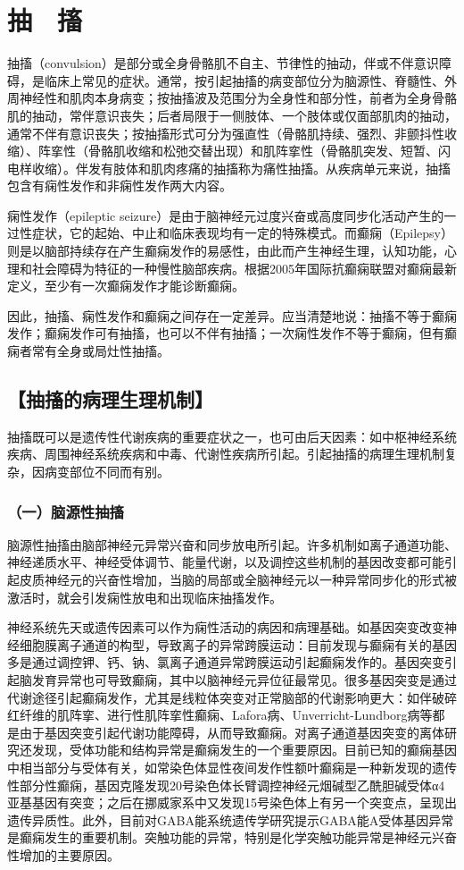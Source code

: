 \chapter{抽　搐}

抽搐（convulsion）是部分或全身骨骼肌不自主、节律性的抽动，伴或不伴意识障碍，是临床上常见的症状。通常，按引起抽搐的病变部位分为脑源性、脊髓性、外周神经性和肌肉本身病变；按抽搐波及范围分为全身性和部分性，前者为全身骨骼肌的抽动，常伴意识丧失；后者局限于一侧肢体、一个肢体或仅面部肌肉的抽动，通常不伴有意识丧失；按抽搐形式可分为强直性（骨骼肌持续、强烈、非颤抖性收缩）、阵挛性（骨骼肌收缩和松弛交替出现）和肌阵挛性（骨骼肌突发、短暂、闪电样收缩）。伴发有肢体和肌肉疼痛的抽搐称为痛性抽搐。从疾病单元来说，抽搐包含有痫性发作和非痫性发作两大内容。

痫性发作（epileptic
seizure）是由于脑神经元过度兴奋或高度同步化活动产生的一过性症状，它的起始、中止和临床表现均有一定的特殊模式。而癫痫（Epilepsy）则是以脑部持续存在产生癫痫发作的易感性，由此而产生神经生理，认知功能，心理和社会障碍为特征的一种慢性脑部疾病。根据2005年国际抗癫痫联盟对癫痫最新定义，至少有一次癫痫发作才能诊断癫痫。

因此，抽搐、痫性发作和癫痫之间存在一定差异。应当清楚地说：抽搐不等于癫痫发作；癫痫发作可有抽搐，也可以不伴有抽搐；一次痫性发作不等于癫痫，但有癫痫者常有全身或局灶性抽搐。

\section{【抽搐的病理生理机制】}

抽搐既可以是遗传性代谢疾病的重要症状之一，也可由后天因素：如中枢神经系统疾病、周围神经系统疾病和中毒、代谢性疾病所引起。引起抽搐的病理生理机制复杂，因病变部位不同而有别。

\subsection{（一）脑源性抽搐}

脑源性抽搐由脑部神经元异常兴奋和同步放电所引起。许多机制如离子通道功能、神经递质水平、神经受体调节、能量代谢，以及调控这些机制的基因改变都可能引起皮质神经元的兴奋性增加，当脑的局部或全脑神经元以一种异常同步化的形式被激活时，就会引发痫性放电和出现临床抽搐发作。

神经系统先天或遗传因素可以作为痫性活动的病因和病理基础。如基因突变改变神经细胞膜离子通道的构型，导致离子的异常跨膜运动：目前发现与癫痫有关的基因多是通过调控钾、钙、钠、氯离子通道异常跨膜运动引起癫痫发作的。基因突变引起脑发育异常也可导致癫痫，其中以脑神经元异位征最常见。很多基因突变是通过代谢途径引起癫痫发作，尤其是线粒体突变对正常脑部的代谢影响更大：如伴破碎红纤维的肌阵挛、进行性肌阵挛性癫痫、Lafora病、Unverricht-Lundborg病等都是由于基因突变引起代谢功能障碍，从而导致癫痫。对离子通道基因突变的离体研究还发现，受体功能和结构异常是癫痫发生的一个重要原因。目前已知的癫痫基因中相当部分与受体有关，如常染色体显性夜间发作性额叶癫痫是一种新发现的遗传性部分性癫痫，基因克隆发现20号染色体长臂调控神经元烟碱型乙酰胆碱受体α4亚基基因有突变；之后在挪威家系中又发现15号染色体上有另一个突变点，呈现出遗传异质性。此外，目前对GABA能系统遗传学研究提示GABA能A受体基因异常是癫痫发生的重要机制。突触功能的异常，特别是化学突触功能异常是神经元兴奋性增加的主要原因。

